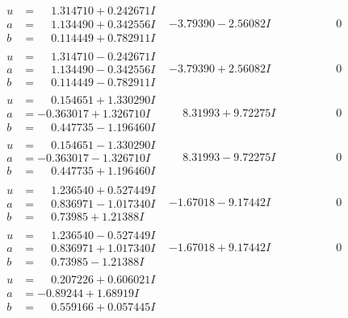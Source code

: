 \documentclass[1p]{elsarticle_modified}
\theoremstyle{definition}
\begin{document}
$$\begin{array}{c|c|c}
\begin{aligned}
u &= \phantom{-}1.314710 + 0.242671 I \\
a &= \phantom{-}1.134490 + 0.342556 I \\
b &= \phantom{-}0.114449 + 0.782911 I\end{aligned}
 & -3.79390 - 2.56082 I & \phantom{-0.000000 } 0 \\ \hline\begin{aligned}
u &= \phantom{-}1.314710 - 0.242671 I \\
a &= \phantom{-}1.134490 - 0.342556 I \\
b &= \phantom{-}0.114449 - 0.782911 I\end{aligned}
 & -3.79390 + 2.56082 I & \phantom{-0.000000 } 0 \\ \hline\begin{aligned}
u &= \phantom{-}0.154651 + 1.330290 I \\
a &= -0.363017 + 1.326710 I \\
b &= \phantom{-}0.447735 - 1.196460 I\end{aligned}
 & \phantom{-}8.31993 + 9.72275 I & \phantom{-0.000000 } 0 \\ \hline\begin{aligned}
u &= \phantom{-}0.154651 - 1.330290 I \\
a &= -0.363017 - 1.326710 I \\
b &= \phantom{-}0.447735 + 1.196460 I\end{aligned}
 & \phantom{-}8.31993 - 9.72275 I & \phantom{-0.000000 } 0 \\ \hline\begin{aligned}
u &= \phantom{-}1.236540 + 0.527449 I \\
a &= \phantom{-}0.836971 - 1.017340 I \\
b &= \phantom{-}0.73985 + 1.21388 I\end{aligned}
 & -1.67018 - 9.17442 I & \phantom{-0.000000 } 0 \\ \hline\begin{aligned}
u &= \phantom{-}1.236540 - 0.527449 I \\
a &= \phantom{-}0.836971 + 1.017340 I \\
b &= \phantom{-}0.73985 - 1.21388 I\end{aligned}
 & -1.67018 + 9.17442 I & \phantom{-0.000000 } 0 \\ \hline\begin{aligned}
u &= \phantom{-}0.207226 + 0.606021 I \\
a &= -0.89244 + 1.68919 I \\
b &= \phantom{-}0.559166 + 0.057445 I\end{aligned}

\end{array}$$
\end{document}
